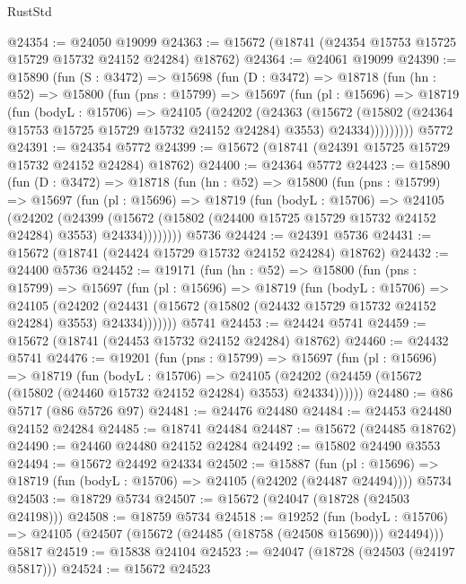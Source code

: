 \begin{lexlean}{RustStd}
\begin{coremodule}
@24354 := @24050 @19099
@24363 := @15672 (@18741 (@24354 @15753 @15725 @15729 @15732 @24152 @24284) @18762)
@24364 := @24061 @19099
@24390 := @15890
    (fun (S : @3472) =>
    @15698
      (fun (D : @3472) =>
      @18718
        (fun (hn : @52) =>
        @15800
          (fun (pns : @15799) =>
          @15697
            (fun (pl : @15696) =>
            @18719
              (fun (bodyL : @15706) =>
              @24105
                (@24202
                  (@24363
                    (@15672
                      (@15802 (@24364 @15753 @15725 @15729 @15732 @24152 @24284) @3553)
                      @24334)))))))))
    @5772
@24391 := @24354 @5772
@24399 := @15672 (@18741 (@24391 @15725 @15729 @15732 @24152 @24284) @18762)
@24400 := @24364 @5772
@24423 := @15890
    (fun (D : @3472) =>
    @18718
      (fun (hn : @52) =>
      @15800
        (fun (pns : @15799) =>
        @15697
          (fun (pl : @15696) =>
          @18719
            (fun (bodyL : @15706) =>
            @24105
              (@24202
                (@24399
                  (@15672 (@15802 (@24400 @15725 @15729 @15732 @24152 @24284) @3553) @24334))))))))
    @5736
@24424 := @24391 @5736
@24431 := @15672 (@18741 (@24424 @15729 @15732 @24152 @24284) @18762)
@24432 := @24400 @5736
@24452 := @19171
    (fun (hn : @52) =>
    @15800
      (fun (pns : @15799) =>
      @15697
        (fun (pl : @15696) =>
        @18719
          (fun (bodyL : @15706) =>
          @24105
            (@24202
              (@24431 (@15672 (@15802 (@24432 @15729 @15732 @24152 @24284) @3553) @24334)))))))
    @5741
@24453 := @24424 @5741
@24459 := @15672 (@18741 (@24453 @15732 @24152 @24284) @18762)
@24460 := @24432 @5741
@24476 := @19201
    (fun (pns : @15799) =>
    @15697
      (fun (pl : @15696) =>
      @18719
        (fun (bodyL : @15706) =>
        @24105 (@24202 (@24459 (@15672 (@15802 (@24460 @15732 @24152 @24284) @3553) @24334))))))
@24480 := @86 @5717 (@86 @5726 @97)
@24481 := @24476 @24480
@24484 := @24453 @24480 @24152 @24284
@24485 := @18741 @24484
@24487 := @15672 (@24485 @18762)
@24490 := @24460 @24480 @24152 @24284
@24492 := @15802 @24490 @3553
@24494 := @15672 @24492 @24334
@24502 := @15887
    (fun (pl : @15696) => @18719 (fun (bodyL : @15706) => @24105 (@24202 (@24487 @24494))))
    @5734
@24503 := @18729 @5734
@24507 := @15672 (@24047 (@18728 (@24503 @24198)))
@24508 := @18759 @5734
@24518 := @19252
    (fun (bodyL : @15706) => @24105 (@24507 (@15672 (@24485 (@18758 (@24508 @15690))) @24494)))
    @5817
@24519 := @15838 @24104
@24523 := @24047 (@18728 (@24503 (@24197 @5817)))
@24524 := @15672 @24523

\end{coremodule}
\end{lexlean}
